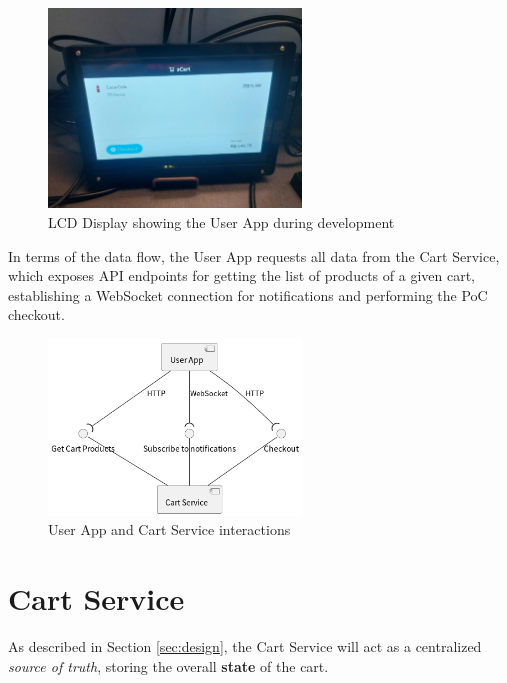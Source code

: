 \documentclass[openright]{normas-utf-tex} %
\begin{document}
\begin{figure}[H]
	\centering
	\includegraphics[width=0.6\textwidth]{./images/lcddisplay.jpeg}
	\caption[LCD Display showing the User App during development]{LCD Display showing the User App during development}
	\label{fig:dummy}
\end{figure}

In terms of the data flow, the User App requests all data from the Cart Service, which exposes API endpoints for
getting the list of products of a given cart, establishing a WebSocket connection for notifications and performing
the PoC checkout.

\begin{figure}[H]
	\centering
	\includegraphics[width=0.6\textwidth]{./images/diagrams/UserApp.png}
	\caption[User App and Cart Service interactions]{User App and Cart Service interactions}
	\label{fig:dummy}
\end{figure}

\section{Cart Service}

As described in Section \ref{sec:design}, the Cart Service will act as a
centralized \textit{source of truth}, storing the overall \textbf{state} of the
cart.
\end{document}
